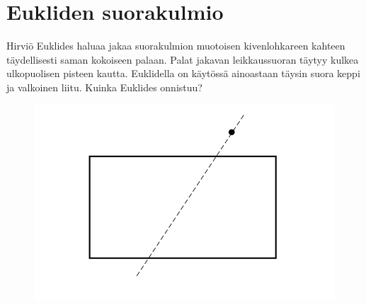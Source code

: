 \clearpage

\section{Eukliden suorakulmio}

Hirviö Euklides haluaa jakaa suorakulmion muotoisen kivenlohkareen kahteen täydellisesti saman kokoiseen palaan. Palat jakavan leikkaussuoran täytyy kulkea ulkopuolisen pisteen kautta. Euklidella on käytössä ainoastaan täysin suora keppi ja valkoinen liitu. Kuinka Euklides onnistuu?

\begin{figure}[h]
    \centering
    \includegraphics[width=0.6\linewidth]{kuvat/suorakulmio_kahteen_osaan.png}  
\end{figure}